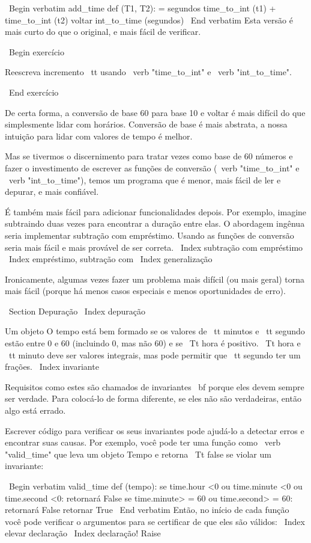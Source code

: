 \documentclass[10pt]{book}
\begin{document}
{{{{{{{{{{{{{{\ Begin {verbatim}
add_time def (T1, T2):
    = segundos time_to_int (t1) + time_to_int (t2)
    voltar int_to_time (segundos)
\ End {verbatim}
%
Esta versão é mais curto do que o original, e mais fácil de verificar.

\ Begin {} exercício

Reescreva {incremento \ tt} usando \ verb "time_to_int" e \ verb "int_to_time".

\ End {} exercício

De certa forma, a conversão de base 60 para base 10 e voltar é mais difícil
do que simplesmente lidar com horários. Conversão de base é mais abstrata, a nossa
intuição para lidar com valores de tempo é melhor.

Mas se tivermos o discernimento para tratar vezes como base de 60 números e fazer
o investimento de escrever as funções de conversão (\ verb "time_to_int"
e \ verb "int_to_time"), temos um programa que é menor, mais fácil de
ler e depurar, e mais confiável.

É também mais fácil para adicionar funcionalidades depois. Por exemplo, imagine
subtraindo duas vezes para encontrar a duração entre elas. O
abordagem ingênua seria implementar subtração com empréstimo.
Usando as funções de conversão seria mais fácil e mais provável de ser
correta.
\ Index {subtração com empréstimo}
\ Index {empréstimo, subtração com}
\ Index {generalização}

Ironicamente, algumas vezes fazer um problema mais difícil (ou mais geral) torna
mais fácil (porque há menos casos especiais e menos oportunidades
de erro).


\ Section {} Depuração
\ Index {depuração}

Um objeto O tempo está bem formado se os valores de {\ tt minutos} e {\ tt
segundo} estão entre 0 e 60 (incluindo 0, mas não 60) e se 
{\ Tt hora} é positivo. {\ Tt hora} e {\ tt minuto} deve ser
valores integrais, mas pode permitir que {\ tt segundo} ter um
frações.
\ Index {} invariante

Requisitos como estes são chamados de invariantes {\ bf} porque
eles devem sempre ser verdade. Para colocá-lo de forma diferente, se eles
não são verdadeiras, então algo está errado.

Escrever código para verificar os seus invariantes pode ajudá-lo a detectar erros
e encontrar suas causas. Por exemplo, você pode ter uma função
como \ verb "valid_time" que leva um objeto Tempo e retorna
{\ Tt false} se violar um invariante:

\ Begin {verbatim}
valid_time def (tempo):
    se time.hour <0 ou time.minute <0 ou time.second <0:
        retornará False
    se time.minute> = 60 ou time.second> = 60:
        retornará False
    retornar True
\ End {verbatim}
%
Então, no início de cada função você pode verificar o
argumentos para se certificar de que eles são válidos:
\ Index {elevar declaração}
\ Index {declaração! Raise}

}}}}}}}}}}}}}}
\end{document}
